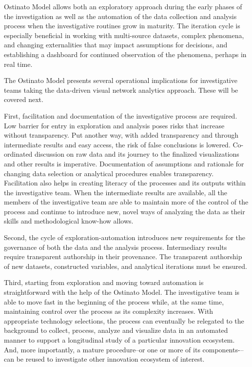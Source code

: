 Ostinato Model allows both an exploratory approach during the early phases of the investigation as well as the automation of the data collection and analysis process when the investigative routines grow in maturity. The iteration cycle is especially beneficial in working with multi-source datasets, complex phenomena, and changing externalities that may impact assumptions for decisions, and establishing a dashboard for continued observation of the phenomena, perhaps in real time.

The Ostinato Model presents several operational implications for investigative teams taking the data-driven visual network analytics approach. These will be covered next.

First, facilitation and documentation of the investigative process are required. Low barrier for entry in exploration and analysis poses risks that increase without transparency. Put another way, with added transparency and through intermediate results and easy access, the risk of false conclusions is lowered. Co-ordinated discussion on raw data and its journey to the finalized visualizations and other results is imperative. Documentation of assumptions and rationale for changing data selection or analytical procedures enables transparency. Facilitation also helps in creating literacy of the processes and its outputs within the investigative team. When the intermediate results are available, all the members of the investigative team are able to maintain more of the control of the process and continue to introduce new, novel ways of analyzing the data as their skills and methodological know-how allows.

Second, the cycle of exploration-automation introduces new requirements for the governance of both the data and the analysis process. Intermediary results require transparent authorship in their provenance. The transparent authorship of new datasets, constructed variables, and analytical iterations must be ensured.

Third, starting from exploration and moving toward automation is straightforward with the help of the Ostinato Model. The investigative team is able to move fast in the beginning of the process while, at the same time, maintaining control over the process as its complexity increases. With appropriate technology selections, the process can eventually be relegated to the background to collect, process, analyze and visualize data in an automated manner to support a longitudinal study of a particular innovation ecosystem. And, more importantly, a mature procedure--or one or more of its components-–can be reused to investigate other innovation ecosystem of interest.


